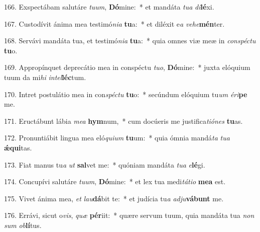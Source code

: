 166. Exspectábam salutáre \textit{tu}\textit{um}, \textbf{Dó}mine:~*  et mandáta \textit{tu}\textit{a} \textit{di}\textbf{lé}xi.\

167. Custodívit ánima mea testimó\textit{ni}\textit{a} \textbf{tu}a:~*  et diléxit e\textit{a} \textit{ve}\textit{he}\textbf{mén}ter.\

168. Servávi mandáta tua, et testimó\textit{ni}\textit{a} \textbf{tu}a:~*  quia omnes viæ meæ in \textit{con}\textit{spéc}\textit{tu} \textbf{tu}o.\

169. Appropínquet deprecátio mea in conspéctu \textit{tu}\textit{o}, \textbf{Dó}mine:~*  juxta elóquium tuum da mi\textit{hi} \textit{in}\textit{tel}\textbf{léc}tum.\

170. Intret postulátio mea in con\textit{spéc}\textit{tu} \textbf{tu}o:~*  secúndum elóquium tu\textit{um} \textit{é}\textit{ri}\textbf{pe} me.\

171. Eructábunt lábia \textit{me}\textit{a} \textbf{hym}num,~*  cum docúeris me justifica\textit{ti}\textit{ó}\textit{nes} \textbf{tu}as.\

172. Pronuntiábit lingua mea eló\textit{qui}\textit{um} \textbf{tu}um:~*  quia ómnia mandá\textit{ta} \textit{tu}\textit{a} \textbf{ǽ}\textbf{qui}tas.\

173. Fiat manus tu\textit{a} \textit{ut} \textbf{sal}vet me:~*  quóniam mandáta \textit{tu}\textit{a} \textit{e}\textbf{lé}gi.\

174. Concupívi salutáre \textit{tu}\textit{um}, \textbf{Dó}mine:~*  et lex tua medi\textit{tá}\textit{ti}\textit{o} \textbf{me}\textbf{a} est.\

175. Vivet ánima mea, \textit{et} \textit{lau}\textbf{dá}bit te:~*  et judícia tu\textit{a} \textit{ad}\textit{ju}\textbf{vá}\textbf{bunt} me.\

176. Errávi, sicut o\textit{vis}, \textit{quæ} \textbf{pér}iit:~*  quære servum tuum, quia mandáta tua \textit{non} \textit{sum} \textit{ob}\textbf{lí}tus.\

